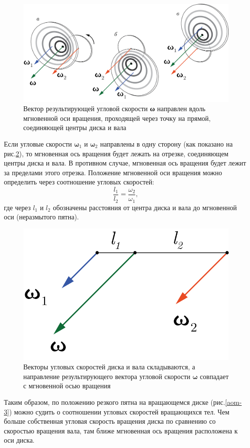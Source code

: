 \documentclass[../../../All.tex]{subfiles}
\begin{document}
\begin{figure}
	\centering 	
	\includegraphics[width=0.8\linewidth]{aom-5.png}
	\caption{Вектор результирующей угловой скорости \textbf{ω} направлен вдоль мгновенной оси вращения, проходящей через точку на прямой, соединяющей центры диска и вала}
	\label{aom-5}
\end{figure}

Если угловые скорости $ \textbf{ω}_1$ и $ \textbf{ω}_2$ направлены в одну сторону (как показано на рис.\ref{aom-6}), то мгновенная ось вращения будет лежать на отрезке, соединяющем центры диска и вала. В противном случае, мгновенная ось вращения будет лежит за пределами этого отрезка. Положение мгновенной оси вращения можно определить через соотношение угловых скоростей:
$$
\dfrac{l_1}{l_2}  = \dfrac{\omega_2}{\omega_1},
$$
где через $ l_1 $ и $ l_2 $ обозначены расстояния от центра диска и вала до мгновенной оси (неразмытого пятна).

\begin{figure}[H]
	\centering 	
	\includegraphics[width=0.3\linewidth]{aom-6.png}
	\caption{Векторы угловых скоростей диска и вала складываются, а направление результирующего вектора угловой скорости $\textbf{ω}$ совпадает с мгновенной осью вращения}
	\label{aom-6}
\end{figure}

Таким образом, по положению резкого пятна на вращающемся диске (рис.\ref{aom-3}) можно судить о соотношении угловых скоростей вращающихся тел. Чем больше собственная угловая скорость вращения диска по сравнению со скоростью вращения вала, там ближе мгновенная ось вращения расположена к оси диска. 
\end{document}
